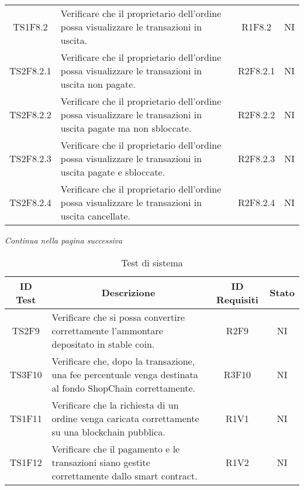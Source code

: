 \begin{table}[H]
\begin{tabular}{c|p{8cm}|c|c}
    TS1F8.2   & Verificare che il proprietario dell'ordine possa visualizzare le transazioni in uscita.                            & R1F8.2   & NI \\
    TS2F8.2.1 & Verificare che il proprietario dell'ordine possa visualizzare le transazioni in uscita non pagate.                 & R2F8.2.1 & NI \\
    TS2F8.2.2 & Verificare che il proprietario dell'ordine possa visualizzare le transazioni in uscita pagate ma non sbloccate.    & R2F8.2.2 & NI \\
    TS2F8.2.3 & Verificare che il proprietario dell'ordine possa visualizzare le transazioni in uscita pagate e sbloccate.         & R2F8.2.3 & NI \\
    TS2F8.2.4 & Verificare che il proprietario dell'ordine possa visualizzare le transazioni in uscita cancellate.                 & R2F8.2.4 & NI \\
  \end{tabular}
\end{table}
\begin{center}
  \textit{\small Continua nella pagina successiva}
\end{center}
\begin{table}[H]
  \centering
  \renewcommand{\arraystretch}{1.8}
  \begin{tabular}{c|p{8cm}|c|c}
    \rowcolor[HTML]{125E28}
    \color[HTML]{FFFFFF}\textbf{ID Test}
           & \multicolumn{1}{c}{\color[HTML]{FFFFFF}\textbf{Descrizione}}
           & \color[HTML]{FFFFFF}\textbf{ID Requisiti}
           & \color[HTML]{FFFFFF}\textbf{Stato}                                                                                      \\
    \hline
    TS2F9  & Verificare che si possa convertire correttamente l'ammontare depositato in stable coin.                    & R2F9  & NI \\
    TS3F10 & Verificare che, dopo la transazione, una fee percentuale venga destinata al fondo ShopChain correttamente. & R3F10 & NI \\
    TS1F11 & Verificare che la richiesta di un ordine venga caricata correttamente su una blockchain\glo{} pubblica.          & R1V1  & NI \\
    TS1F12 & Verificare che il pagamento e le transazioni siano gestite correttamente dallo smart contract.             & R1V2  & NI \\
  \end{tabular}
  \caption{Test di sistema}
\end{table}

